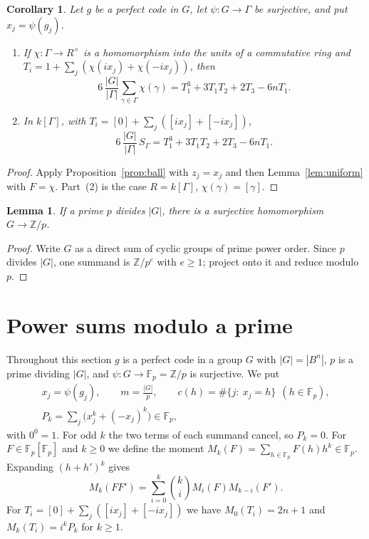 \documentclass{amsart}
\newtheorem{lemma}[theorem]{Lemma}
\newtheorem{corollary}[theorem]{Corollary}
\theoremstyle{definition}
\theoremstyle{remark}
\numberwithin{equation}{section}
\newcommand{\Z}{\mathbb{Z}}
\newcommand{\F}{\mathbb{F}}
\newcommand{\gp}[1]{[#1]}
\begin{document}
\begin{corollary}\label{cor:projected}
Let $g$ be a perfect code in $G$, let $\psi\colon G\to\Gamma$ be surjective, and put $x_j=\psi(g_j)$.
\begin{enumerate}
\item If $\chi\colon\Gamma\to R^\times$ is a homomorphism into the units of a commutative ring and $T_i=1+\sum_j(\chi(ix_j)+\chi(-ix_j))$, then
\begin{equation}\label{eq:chi}
6\,\frac{|G|}{|\Gamma|}\sum_{\gamma\in\Gamma}\chi(\gamma)=T_1^3+3T_1T_2+2T_3-6nT_1.
\end{equation}
\item In $k[\Gamma]$, with $T_i=\gp0+\sum_j(\gp{ix_j}+\gp{-ix_j})$,
\begin{equation}\label{eq:groupring}
6\,\frac{|G|}{|\Gamma|}\,S_\Gamma=T_1^3+3T_1T_2+2T_3-6nT_1.
\end{equation}
\end{enumerate}
\end{corollary}

\begin{proof}
Apply Proposition~\ref{prop:ball} with $z_j=x_j$ and then Lemma~\ref{lem:uniform} with $F=\chi$. Part~(2) is the case $R=k[\Gamma]$, $\chi(\gamma)=\gp{\gamma}$.
\end{proof}

\begin{lemma}\label{lem:surj}
If a prime $p$ divides $|G|$, there is a surjective homomorphism $G\to\Z/p$.
\end{lemma}

\begin{proof}
Write $G$ as a direct sum of cyclic groups of prime power order. Since $p$ divides $|G|$, one summand is $\Z/p^e$ with $e\ge1$; project onto it and reduce modulo $p$.
\end{proof}

\section{Power sums modulo a prime}\label{sec:moments}

Throughout this section $g$ is a perfect code in a group $G$ with $|G|=|B^n|$, $p$ is a prime dividing $|G|$, and $\psi\colon G\to\F_p=\Z/p$ is surjective. We put
\begin{gather*}
x_j=\psi(g_j),\qquad m=\frac{|G|}{p},\qquad c(h)=\#\{j:\ x_j=h\}\ \ (h\in\F_p),\\
P_k=\sum_j\bigl(x_j^k+(-x_j)^k\bigr)\in\F_p,
\end{gather*}
with $0^0=1$. For odd $k$ the two terms of each summand cancel, so $P_k=0$. For $F\in\F_p[\F_p]$ and $k\ge0$ we define the moment $M_k(F)=\sum_{h\in\F_p}F(h)h^k\in\F_p$. Expanding $(h+h')^k$ gives
\begin{equation}\label{eq:leibniz}
M_k(FF')=\sum_{i=0}^{k}\binom{k}{i}M_i(F)M_{k-i}(F').
\end{equation}
For $T_i=\gp0+\sum_j(\gp{ix_j}+\gp{-ix_j})$ we have $M_0(T_i)=2n+1$ and $M_k(T_i)=i^kP_k$ for $k\ge1$.
\end{document}
